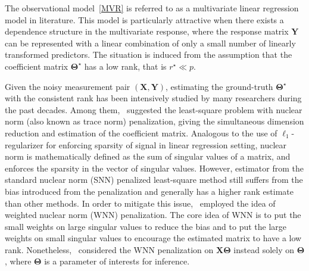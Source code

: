 \documentclass[alpha-refs]{wiley-article}
\begin{document}
The observational model~\eqref{MVR} is referred to as a multivariate linear regression model in literature. 
This model is particularly attractive when there exists a dependence structure in the multivariate response, where the response matrix $\boldsymbol{Y}$ can be represented with a linear combination of only a small number of linearly transformed predictors. 
The situation is induced from the assumption that the coefficient matrix $\boldsymbol{\Theta}^{\star}$ has a low rank, that is $r^{\star} \ll p$.

Given the noisy measurement pair $(\boldsymbol{X},\boldsymbol{Y})$, estimating the ground-truth $\boldsymbol{\Theta}^{\star}$ with the consistent rank has been intensively studied by many researchers during the past decades.
Among them,~\citet{yuan2007dimension} suggested the least-square problem with nuclear norm (also known as trace norm) penalization, giving the simultaneous dimension reduction and estimation of the coefficient matrix.
Analogous to the use of $\ell_{1}$-regularizer for enforcing sparsity of signal in linear regression setting, 
nuclear norm is mathematically defined as the sum of singular values of a matrix, and enforces the sparsity in the vector of singular values.
However, estimator from the standard nuclear norm (SNN) penalized least-square method still suffers from the bias introduced from the penalization and generally has a higher rank estimate than other methods.
In order to mitigate this issue,~\citet{chen2013reduced} employed the idea of weighted nuclear norm (WNN) penalization.
The core idea of WNN is to put the small weights on large singular values to reduce the bias and to put the large weights on small singular values to encourage the estimated matrix to have a low rank. 
Nonetheless,~\citet{chen2013reduced} considered the WNN penalization on $\boldsymbol{X\Theta}$ instead solely on $\boldsymbol{\Theta}$, where $\boldsymbol{\Theta}$ is a parameter of interests for inference.
\end{document}

